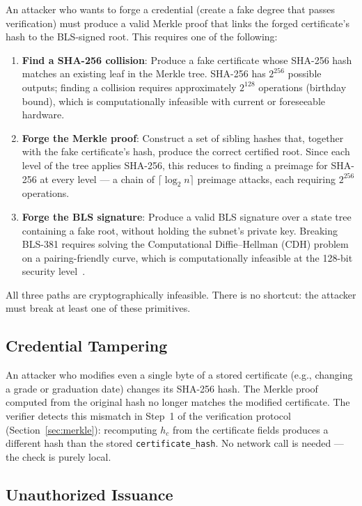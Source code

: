 \documentclass[conference]{IEEEtran}
\begin{document}
An attacker who wants to forge a credential (create a fake degree that passes verification) must produce a valid Merkle proof that links the forged certificate's hash to the BLS-signed root. This requires one of the following:

\begin{enumerate}
  \item \textbf{Find a SHA-256 collision}: Produce a fake certificate whose SHA-256 hash matches an existing leaf in the Merkle tree. SHA-256 has $2^{256}$ possible outputs; finding a collision requires approximately $2^{128}$ operations (birthday bound), which is computationally infeasible with current or foreseeable hardware.
  \item \textbf{Forge the Merkle proof}: Construct a set of sibling hashes that, together with the fake certificate's hash, produce the correct certified root. Since each level of the tree applies SHA-256, this reduces to finding a preimage for SHA-256 at every level — a chain of $\lceil\log_2 n\rceil$ preimage attacks, each requiring $2^{256}$ operations.
  \item \textbf{Forge the BLS signature}: Produce a valid BLS signature over a state tree containing a fake root, without holding the subnet's private key. Breaking BLS-381 requires solving the Computational Diffie--Hellman (CDH) problem on a pairing-friendly curve, which is computationally infeasible at the 128-bit security level~\cite{boneh2001bls}.
\end{enumerate}

All three paths are cryptographically infeasible. There is no shortcut: the attacker must break at least one of these primitives.

\subsection{Credential Tampering}

An attacker who modifies even a single byte of a stored certificate (e.g., changing a grade or graduation date) changes its SHA-256 hash. The Merkle proof computed from the original hash no longer matches the modified certificate. The verifier detects this mismatch in Step~1 of the verification protocol (Section~\ref{sec:merkle}): recomputing $h_c$ from the certificate fields produces a different hash than the stored \texttt{certificate\_hash}. No network call is needed — the check is purely local.

\subsection{Unauthorized Issuance}
\end{document}
